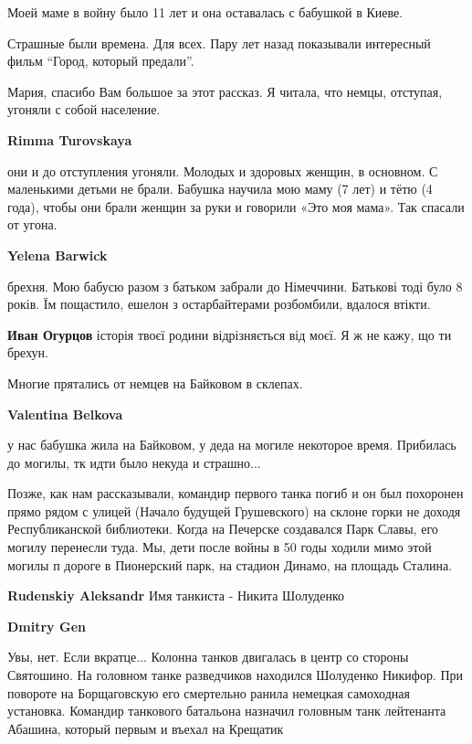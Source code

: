 \begin{itemize}
Моей маме в войну было 11 лет и она оставалась с бабушкой в Киеве.

Страшные были времена. Для всех. Пару лет назад показывали интересный фильм \enquote{Город, который предали}.

Мария, спасибо Вам большое за этот рассказ. Я читала, что немцы, отступая, угоняли с собой население.

\begin{itemize} %
\textbf{Rimma Turovskaya} 

они и до отступления угоняли. Молодых и здоровых женщин, в основном. С
маленькими детьми не брали. Бабушка научила мою маму (7 лет) и тётю (4 года),
чтобы они брали женщин за руки и говорили «Это моя мама». Так спасали от угона.


\textbf{Yelena Barwick} 

брехня. Мою бабусю разом з батьком забрали до Німеччини. Батькові тоді було 8
років. Їм пощастило, ешелон з остарбайтерами розбомбили, вдалося втікти.


\textbf{Иван Огурцов} історія твоєї родини відрізняється від моєї. Я ж не кажу, що ти брехун.
\end{itemize} %

Многие прятались от немцев на Байковом в склепах.

\textbf{Valentina Belkova} 

у нас бабушка жила на Байковом, у деда на могиле некоторое время. Прибилась до
могилы, тк идти было некуда и страшно...


Позже, как нам рассказывали, командир первого танка погиб и он был похоронен
прямо рядом с улицей (Начало будущей Грушевского) на склоне горки не доходя
Республиканской библиотеки. Когда на Печерске создавался Парк Славы, его могилу
перенесли туда. Мы, дети после войны в 50 годы ходили мимо этой могилы п дороге
в Пионерский парк, на стадион Динамо, на площадь Сталина.

\begin{itemize} %
\textbf{Rudenskiy Aleksandr} Имя танкиста - Никита Шолуденко

\textbf{Dmitry Gen} 

Увы, нет. Если вкратце... Колонна танков двигалась в центр со стороны
Святошино. На головном танке разведчиков находился Шолуденко Никифор. При
повороте на Борщаговскую его смертельно ранила немецкая самоходная установка.
Командир танкового батальона назначил головным танк лейтенанта Абашина, который
первым и въехал на Крещатик



\end{itemize}
\end{itemize}
